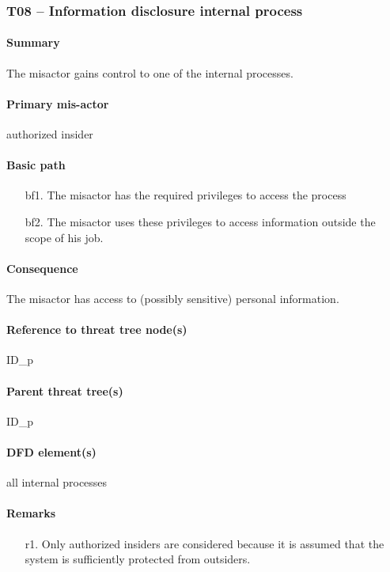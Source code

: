 \subsubsection{T08 -- Information disclosure internal process}

\paragraph{Summary} The misactor gains control to one of the internal processes.

\paragraph{Primary mis-actor} authorized insider

\paragraph{Basic path}
\begin{enumerate}
	\item[bf1.] The misactor has the required privileges to access the process
	\item[bf2.] The misactor uses these privileges to access information outside
	the scope of his job.
\end{enumerate}

\paragraph{Consequence} The misactor has access to (possibly sensitive)
personal information.

\paragraph{Reference to threat tree node(s)} ID\_p

\paragraph{Parent threat tree(s)} ID\_p

\paragraph{DFD element(s)} all internal processes

\paragraph{Remarks}
\begin{enumerate}
     \item[r1.] Only authorized insiders are considered because it is assumed
     that the system is sufficiently protected from outsiders. 
\end{enumerate}
